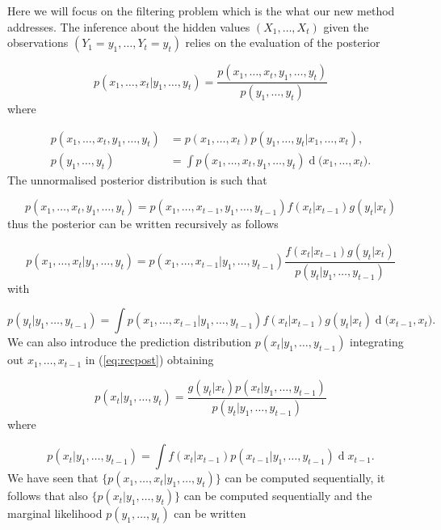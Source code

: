 \documentclass[11pt,a4paper]{article}
\renewcommand{\d}[1]{\ensuremath{\operatorname{d}\!{#1}}}
\begin{document}
Here we will focus on the filtering problem which is the what our new method addresses. The inference about the hidden values $(X_1, \dots, X_t)$ given the observations $(Y_1 = y_1, \dots, Y_t = y_t)$ relies on the evaluation of the posterior

\begin{equation*}
    p(x_1, \dots, x_t | y_1, \dots, y_t) = \frac{p(x_1, \dots, x_t, y_1, \dots, y_t)}{p(y_1, \dots, y_t)}
\end{equation*}
where

\begin{align*}
    p(x_1, \dots, x_t, y_1, \dots, y_t) &= p(x_1, \dots, x_t) p(y_1, \dots, y_t | x_1, \dots, x_t), \\
    p(y_1, \dots, y_t) &= \int p(x_1, \dots, x_t, y_1, \dots, y_t) \d (x_1, \dots, x_t).
\end{align*}
The unnormalised posterior distribution is such that

\begin{equation*}
    p(x_1, \dots, x_t, y_1, \dots, y_t) = p(x_1, \dots, x_{t-1}, y_1, \dots, y_{t-1})f(x_t|x_{t-1})g(y_t|x_t)
\end{equation*}
thus the posterior can be written recursively as follows

\begin{equation} \label{eq:recpost}
    p(x_1, \dots, x_t | y_1, \dots, y_t) = p(x_1, \dots, x_{t-1}| y_1, \dots, y_{t-1})\frac{f(x_t|x_{t-1})g(y_t|x_t)}{p(y_t | y_1, \dots, y_{t-1})}
\end{equation}
with

\begin{equation} \label{eq:condobs}
    p(y_t | y_1, \dots, y_{t-1}) = \int p(x_1, \dots, x_{t-1}| y_1, \dots, y_{t-1}) f(x_t|x_{t-1})g(y_t|x_t) \d (x_{t-1}, x_t).
\end{equation}
We can also introduce the prediction distribution $p(x_t | y_1, \dots, y_{t-1})$ integrating out $x_1, \dots, x_{t-1}$ in (\ref{eq:recpost}) obtaining

\begin{equation*}
    p(x_t | y_1, \dots, y_t) = \frac{g(y_t | x_t) p(x_t | y_1, \dots, y_{t-1})}{p(y_t | y_1, \dots, y_{t-1})}
\end{equation*}
where

\begin{equation*}
    p(x_t | y_1, \dots, y_{t-1}) = \int f(x_t | x_{t-1}) p(x_{t-1} | y_1, \dots, y_{t-1}) \d x_{t-1}.
\end{equation*}
We have seen that $\{ p(x_1, \dots, x_t | y_1, \dots, y_t) \}$ can be computed sequentially, it follows that also $\{ p(x_t | y_1, \dots, y_t) \}$ can be computed sequentially and the marginal likelihood $p(y_1, \dots, y_t)$ can be written
\end{document}
